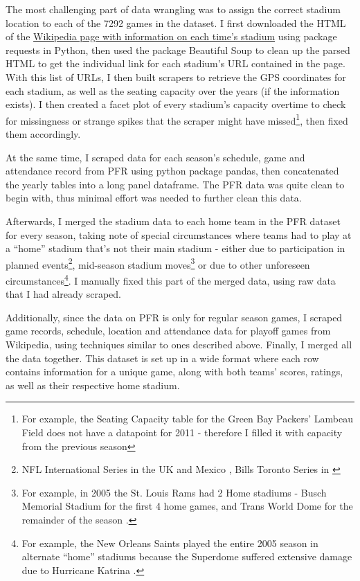 \documentclass[12pt, letterpaper, twoside]{article}
\begin{document}
The most challenging part of data wrangling was to assign the correct stadium location to each of the 7292 games in the dataset. I first downloaded the HTML of the \href{https://en.wikipedia.org/wiki/Chronology_of_home_stadiums_for_current_National_Football_League_teams}{Wikipedia page with information on each time's stadium} \citep{stadium} using package requests \citep{requests} in Python, then used the package Beautiful Soup to clean up the parsed HTML to get the individual link for each stadium's URL contained in the page. With this list of URLs, I then built scrapers to retrieve the GPS coordinates for each stadium, as well as the seating capacity over the years (if the information exists). I then created a facet plot of every stadium's capacity overtime to check for missingness or strange spikes that the scraper might have missed\footnote{For example, the Seating Capacity table for the Green Bay Packers' Lambeau Field \citep{lambeau} does not have a datapoint for 2011 - therefore I filled it with capacity from the previous season}, then fixed them accordingly. 

At the same time, I scraped data for each season's schedule, game and attendance record from PFR using python package pandas, then concatenated the yearly tables into a long panel dataframe. The PFR data was quite clean to begin with, thus minimal effort was needed to further clean this data.

Afterwards, I merged the stadium data to each home team in the PFR dataset for every season, taking note of special circumstances where teams had to play at a ``home'' stadium that's not their main stadium - either due to participation in planned events\footnote{NFL International Series in the UK and Mexico \citep{int}, Bills Toronto Series in \citep{bills} }, mid-season stadium moves\footnote{For example, in 2005 the St. Louis Rams had 2 Home stadiums - Busch Memorial Stadium for the first 4 home games, and Trans World Dome for the remainder of the season \citep{rams}.}   or due to other unforeseen circumstances\footnote{For example, the New Orleans Saints played the entire 2005 season in alternate ``home'' stadiums because the Superdome suffered extensive damage due to Hurricane Katrina \citep{bills}.}. I manually fixed this part of the merged data, using raw data that I had already scraped.  

Additionally, since the data on PFR is only for regular season games, I scraped game records, schedule, location and attendance data for playoff games from Wikipedia, using techniques similar to ones described above. Finally, I merged all the data together. This dataset is set up in a wide format where each row contains information for a unique game, along with both teams' scores, ratings, as well as their respective home stadium.
\end{document}
